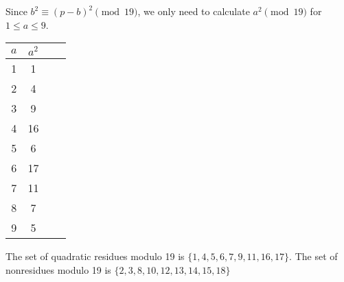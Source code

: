 Since  $b^2 \equiv (p-b)^2 \pmod{19}$, we only need to calculate $a^2 \pmod{19}$
for $1 \leq a \leq 9$.

\begin{table}[H]
\centering
\begin{tabular}{c|cc|c}
	$a$ & $a^2$ \\ \hline
	1   & 1  \\
	2   & 4  \\
	3   & 9  \\
	4   & 16 \\
	5   & 6  \\
	6   & 17 \\
	7   & 11 \\
	8   & 7  \\
	9   & 5
\end{tabular}
\end{table}

The set of quadratic residues modulo 19 is $\{1, 4, 5, 6, 7, 9, 11, 16, 17 \}$.
The set of nonresidues modulo 19 is $\{2, 3, 8, 10, 12, 13, 14, 15, 18 \}$
